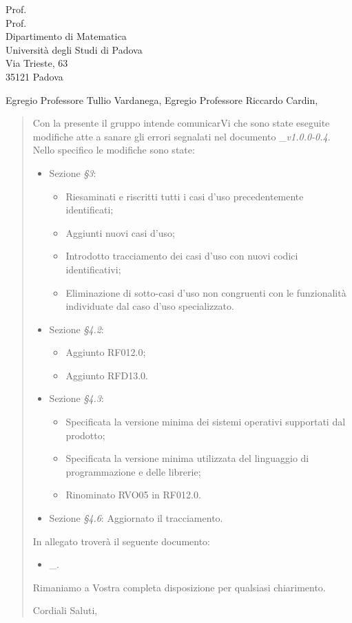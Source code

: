 \documentclass[a4paper,12pt]{letteracdp}
\date{11 febbraio 2021}
\begin{document}
\thispagestyle{empty}

\begin{letter}{
	Prof. \Tullio{} \\
	Prof. \Riccardo{} \\
	Dipartimento di Matematica \\
	Università degli Studi di Padova \\
	Via Trieste, 63 \\
	35121 Padova}
	
\opening{Egregio Professore Tullio Vardanega, \newline
Egregio Professore Riccardo Cardin,}

\begin{quotation}
	\noindent 
	Con la presente il gruppo \gruppo{} intende comunicarVi che sono state eseguite modifiche atte a sanare gli errori segnalati nel documento \docAdR{}\_\textit{v1.0.0-0.4}. \newline{}Nello specifico le modifiche sono state:
	\begin{itemize}
		\item Sezione \textit{\S{}3}:
		\begin{itemize}
			\item Riesaminati e riscritti tutti i casi d'uso precedentemente identificati;
			\item Aggiunti nuovi casi d'uso;
			\item Introdotto tracciamento dei casi d'uso con nuovi codici identificativi;
			\item Eliminazione di sotto-casi d'uso non congruenti con le funzionalità individuate dal caso d'uso specializzato.
		\end{itemize}
		\item Sezione \textit{\S{}4.2}:
		\begin{itemize}
			\item Aggiunto RF012.0;
			\item Aggiunto RFD13.0.
			
		\end{itemize}
		\item Sezione \textit{\S{}4.3}:
		\begin{itemize}
			\item Specificata la versione minima dei sistemi operativi supportati dal prodotto;
			\item Specificata la versione minima utilizzata del linguaggio di programmazione e delle librerie;
			\item Rinominato RVO05 in RF012.0.	
		\end{itemize}
		\item Sezione \textit{\S{}4.6}: Aggiornato il tracciamento.	
	\end{itemize}
In allegato troverà il seguente documento:
\begin{itemize}
		\item \docAdR{}\_\versAdR.		
	\end{itemize}
Rimaniamo a Vostra completa disposizione per qualsiasi chiarimento.

\vspace{0.5cm}
\closing{ Cordiali Saluti,}

\end{quotation}

\end{letter}
\end{document}

